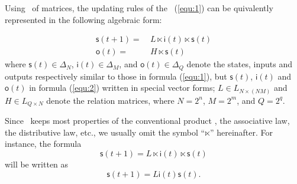 Using \STP\ of matrices, the updating rules of the \BCN\ (\ref{equ:1}) can be quivalently represented in the following algebraic form:
\begin{definition}

\begin{equation}
\begin{split}
\mathsf{s}(t+1)=&\ L\ltimes{\mathsf{i}(t)}\ltimes{\mathsf{s}(t)}\\
\mathsf{o}(t)=&\ H\ltimes{\mathsf{s}(t)}
\end{split}
\label{equ:2}
\end{equation}
where $\mathsf{s}(t)\in\Delta_N$, $\mathsf{i}(t)\in\Delta_M$, and  $\mathsf{o}(t)\in\Delta_Q$ denote the states, inputs and outputs respectively similar to those in formula (\ref{equ:1}), but $\mathsf{s}(t)$, $\mathsf{i}(t)$ and $\mathsf{o}(t)$ in formula (\ref{equ:2}) written in special vector forms; $L\in L_{N\times\left(NM\right)}$ and $H\in L_{Q\times N}$ denote the relation matrices, where $N=2^n$, $M=2^m$, and $Q=2^q$. 
\end{definition}

Since \STP\ keeps most properties of the conventional product \cite{Cheng2011Analysis}, the associative law, the distributive law, etc., we usually omit the symbol ``$\ltimes$'' hereinafter. For instance, the 
formula \[\mathsf{s}(t+1)=L\ltimes{\mathsf{i}(t)}\ltimes{\mathsf{s}(t)}\] will be written as  \[\mathsf{s}(t+1)=L{\mathsf{i}(t)}{\mathsf{s}(t)}.\]

